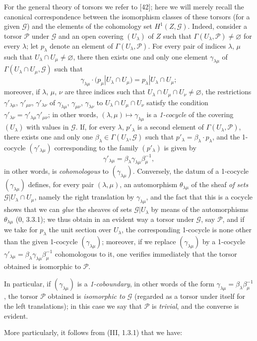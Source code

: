 \begin{env}[16.5.15]
For the general theory of torsors we refer to [42]; here we will
merely recall the canonical correspondence between the isomorphism classes
of these torsors (for a given $\mathscr{G}$) and the elements of
the cohomology set $H^1(Z,\mathscr{G})$. Indeed, consider a
torsor $\mathscr{P}$ under $\mathscr{G}$ and an open covering
$(U_\lambda)$ of $Z$ such that
$\Gamma(U_\lambda,\mathscr{P})\neq\varnothing$ for every $\lambda$;
let $p_\lambda$ denote an element of
$\Gamma(U_\lambda,\mathscr{P})$. For every pair of indices $\lambda$, $\mu$
such that $U_\lambda\cap U_\mu\neq\varnothing$, there then exists one and
only one element $\gamma_{\lambda\mu}$ of
$\Gamma(U_\lambda\cap U_\mu,\mathscr{G})$ such that
\[
  \gamma_{\lambda\mu}\cdot
  (p_\mu|U_\lambda\cap U_\mu)=p_\lambda|U_\lambda\cap U_\mu;
\]
moreover, if $\lambda$, $\mu$, $\nu$ are three indices such that
$U_\lambda\cap U_\mu\cap U_\nu\neq\varnothing$, the restrictions
$\gamma'_{\lambda\mu}$, $\gamma'_{\mu\nu}$, $\gamma'_{\lambda\nu}$ of
$\gamma_{\lambda\mu}$, $\gamma_{\mu\nu}$, $\gamma_{\lambda\nu}$ to
$U_\lambda\cap U_\mu\cap U_\nu$ satisfy the condition
$\gamma'_{\lambda\nu}=\gamma'_{\lambda\mu}\gamma'_{\mu\nu}$; in other words,
$(\lambda,\mu)\mapsto\gamma_{\lambda\mu}$ is a \emph{1-cocycle} of the
covering $(U_\lambda)$ with values in $\mathscr{G}$. If, for every
$\lambda$, $p'_\lambda$ is a second element of
$\Gamma(U_\lambda,\mathscr{P})$, there exists one and only one
$\beta_\lambda\in\Gamma(U_\lambda,\mathscr{G})$ such that
$p'_\lambda=\beta_\lambda\cdot p_\lambda$, and the 1-cocycle
$(\gamma'_{\lambda\mu})$ corresponding to the family $(p'_\lambda)$ is given
by
\[
  \gamma'_{\lambda\mu}=\beta_\lambda\gamma_{\lambda\mu}\beta_\mu^{-1},
\]
in other words, is \emph{cohomologous} to $(\gamma_{\lambda\mu})$.
Conversely, the datum of a 1-cocycle $(\gamma_{\lambda\mu})$ defines, for
every pair $(\lambda,\mu)$, an automorphism $\theta_{\lambda\mu}$ of the
sheaf \emph{of sets}
$\mathscr{G}|U_\lambda\cap U_\mu$, namely the right translation by
$\gamma_{\lambda\mu}$, and the fact that this is a cocycle shows that we
can \emph{glue} the sheaves of sets $\mathscr{G}|U_\lambda$ by
means of the automorphisms $\theta_{\lambda\mu}$ (0, 3.3.1); we thus obtain
in an evident way a torsor under $\mathscr{G}$, say $\mathscr{P}$, and if
we take for $p_\lambda$ the unit section over $U_\lambda$, the
corresponding 1-cocycle is none other than the given 1-cocycle
$(\gamma_{\lambda\mu})$; moreover, if we replace
$(\gamma_{\lambda\mu})$ by a 1-cocycle
$\gamma'_{\lambda\mu}=\beta_\lambda\gamma_{\lambda\mu}\beta_\mu^{-1}$
cohomologous to it, one verifies immediately that the torsor obtained is
isomorphic to $\mathscr{P}$.

In particular, if $(\gamma_{\lambda\mu})$ is a \emph{1-coboundary}, in other
words of the form
$\gamma_{\lambda\mu}=\beta_\lambda\beta_\mu^{-1}$, the torsor
$\mathscr{P}$ obtained is \emph{isomorphic to $\mathscr{G}$} (regarded as a torsor
under itself for the left translations); in this case we say that
$\mathscr{P}$ is \emph{trivial}, and the converse is evident.

More particularly, it follows from (III, 1.3.1) that we have:
\end{env}

